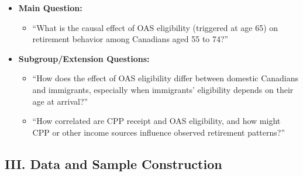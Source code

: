 \documentclass[
]{article}
\providecommand{\tightlist}{%
  \setlength{\itemsep}{0pt}\setlength{\parskip}{0pt}}
\begin{document}
\begin{itemize}
\tightlist
\item
  \textbf{Main Question:}

  \begin{itemize}
  \tightlist
  \item
    ``What is the causal effect of OAS eligibility (triggered at age 65)
    on retirement behavior among Canadians aged 55 to 74?''
  \end{itemize}
\item
  \textbf{Subgroup/Extension Questions:}

  \begin{itemize}
  \tightlist
  \item
    ``How does the effect of OAS eligibility differ between domestic
    Canadians and immigrants, especially when immigrants' eligibility
    depends on their age at arrival?''
  \item
    ``How correlated are CPP receipt and OAS eligibility, and how might
    CPP or other income sources influence observed retirement
    patterns?''
  \end{itemize}
\end{itemize}

\subsection{III. Data and Sample
Construction}\label{iii.-data-and-sample-construction}
\end{document}
